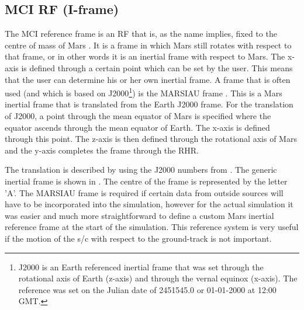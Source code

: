 \subsection{\acl{MCI} \ac{RF} (I-frame)}
\label{subsec:ECI}
The \acf{MCI} reference frame is an \ac{RF} that is, as the name implies, fixed to the centre of mass of Mars \citep{mooij2013fd}. It is a frame in which Mars still rotates with respect to that frame, or in other words it is an inertial frame with respect to Mars. The x-axis is defined through a certain point which can be set by the user. This means that the user can determine his or her own inertial frame. A frame that is often used (and which is based on J2000\footnote{J2000 is an Earth referenced inertial frame that was set through the rotational axis of Earth (z-axis) and through the vernal equinox (x-axis). The reference was set on the Julian date of 2451545.0 or 01-01-2000 at 12:00 \ac{GMT}.}) is the MARSIAU frame \citep{bachman2014naif,diaz2008generic}. This is a Mars inertial frame that is translated from the Earth J2000 frame. For the translation of J2000, a point through the mean equator of Mars is specified where the equator ascends through the mean equator of Earth. The x-axis is defined through this point. The z-axis is then defined through the rotational axis of Mars and the y-axis completes the frame through the \ac{RHR}. 

The translation is described by \cite{bachman2014naif,diaz2008generic} using the J2000 numbers from \cite{archinal2011report}. The generic inertial frame is shown in . The centre of the frame is represented by the letter 'A'. The MARSIAU frame is required if certain data from outside sources will have to be incorporated into the simulation, however for the actual simulation it was easier and much more straightforward to define a custom Mars inertial reference frame at the start of the simulation. This reference system is very useful if the motion of the \ac{s/c} with respect to the ground-track is not important.





